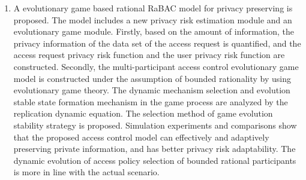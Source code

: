 \documentclass[pdftex,notypeinfo,twoside,openany,UTF8,fntef]{CASthesis}
\theoremstyle{THrm}{
	\newtheorem{question}{Question}[section]
	\newtheorem{property}{性质}[section]
	\newtheorem{assumption}{假设}[section]
	\newtheorem{claim}[lemma]{断言}
	
}
\begin{document}
\begin{enumerate}
	\item 
	A evolutionary game based rational RaBAC model for privacy preserving is proposed. The model includes a new privacy risk estimation module and an evolutionary game module. Firstly, based on the amount of information, the privacy information of the data set of the access request is quantified, and the access request privacy risk function and the user privacy risk function are constructed. Secondly, the multi-participant access control evolutionary game model is constructed under the assumption of bounded rationality by using evolutionary game theory. The dynamic mechanism selection and evolution stable state formation mechanism in the game process are analyzed by the replication dynamic equation. The selection method of game evolution stability strategy is proposed. Simulation experiments and comparisons show that the proposed access control model can effectively and adaptively preserving private information, and has better privacy risk adaptability. The dynamic evolution of access policy selection of bounded rational participants is more in line with the actual scenario.
\end{enumerate}
\end{document}
